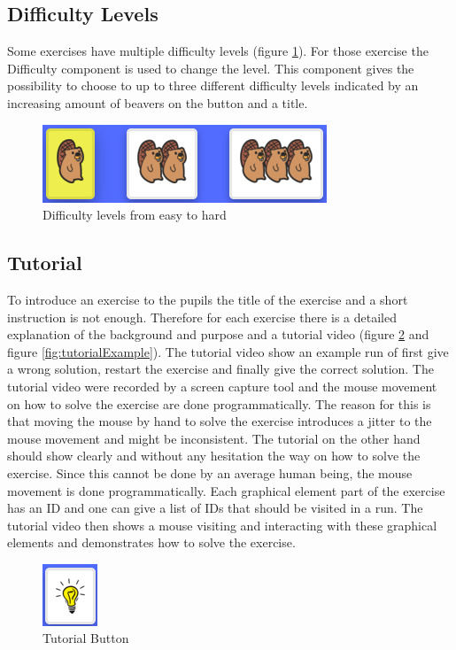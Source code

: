 \subsection*{Difficulty Levels}
Some exercises have multiple difficulty levels (figure \ref{fig:difficultyLevels}). For those exercise the Difficulty component is used to change the level. This component gives the possibility to choose to up to three different difficulty levels indicated by an increasing amount of beavers on the button and a title.

\begin{figure} 
    \centering
    \includegraphics[width=0.4 \columnwidth]{figures/difficulty_level.png}
    \caption{Difficulty levels from easy to hard} 
    \label{fig:difficultyLevels} 
\end{figure}

\subsection*{Tutorial}
To introduce an exercise to the pupils the title of the exercise and a short instruction is not enough. Therefore for each exercise there is a detailed explanation of the background and purpose and a tutorial video (figure \ref{fig:tutorialButton} and figure \ref{fig:tutorialExample}). The tutorial video show an example run of first give a wrong solution, restart the exercise and finally give the correct solution.
The tutorial video were recorded by a screen capture tool and the mouse movement on how to solve the exercise are done programmatically. The reason for this is that moving the mouse by hand to solve the exercise introduces a jitter to the mouse movement and might be inconsistent. The tutorial on the other hand should show clearly and without any hesitation the way on how to solve the exercise. Since this cannot be done by an average human being, the mouse movement is done programmatically. Each graphical element part of the exercise has an ID and one can give a list of IDs that should be visited in a run. The tutorial video then shows a mouse visiting and interacting with these graphical elements and demonstrates how to solve the exercise. 

\begin{figure} 
    \centering
    \includegraphics[width=0.1 \columnwidth]{figures/tutorial_button.png}
    \caption{Tutorial Button} 
    \label{fig:tutorialButton} 
\end{figure}

